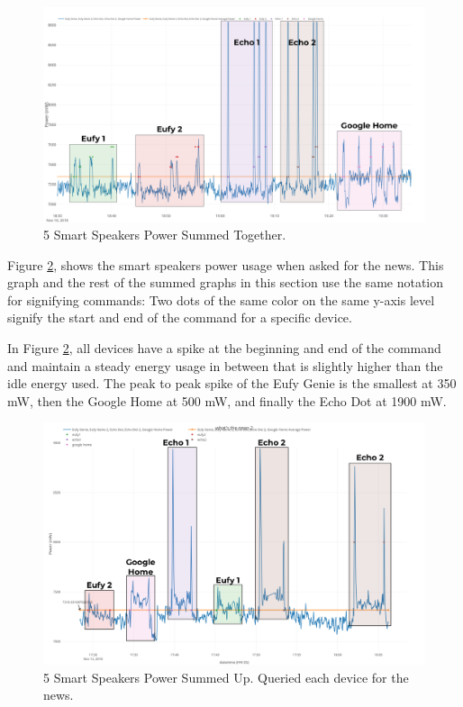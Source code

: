 \begin{figure}[H]
  \centering
  \includegraphics[width=1\textwidth]{figures/weatherSum.png}
  \caption{5 Smart Speakers Power Summed Together.}
  \label{fig:weatherSum}
\end{figure}

Figure \ref{fig:mixedNewsSum}, shows the smart speakers power usage when asked for the news. This graph and the rest of the summed graphs in this section use the same notation for signifying commands: Two dots of the same color on the same y-axis level signify the start and end of the command for a specific device.

In Figure \ref{fig:mixedNewsSum}, all devices have a spike at the beginning and end of the command and maintain a steady energy usage in between that is slightly higher than the idle energy used. The peak to peak spike of the Eufy Genie is the smallest at 350 mW, then the Google Home at 500 mW, and finally the Echo Dot at 1900 mW.

\begin{figure}[H]
  \centering
  \includegraphics[width=1\textwidth]{figures/mixedNewsSum.png}
  \caption{5 Smart Speakers Power Summed Up. Queried each device for the news.}
  \label{fig:mixedNewsSum}
\end{figure}

